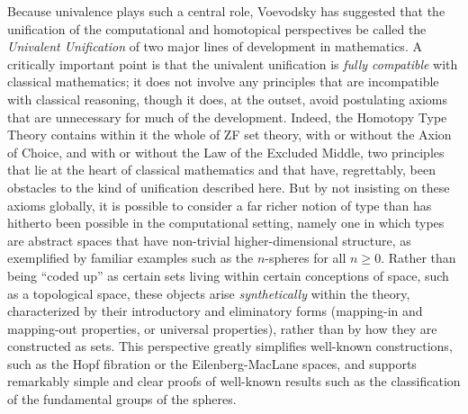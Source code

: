 \documentclass[11pt]{article}
\theoremstyle{remark}
\theoremstyle{definition}
\begin{document}
Because univalence plays such a central role, Voevodsky has suggested that the unification of the computational and
homotopical perspectives be called the \emph{Univalent Unification} of two major lines of development in mathematics.  A
critically important point is that the univalent unification is \emph{fully compatible} with classical mathematics; it
does not involve any principles that are incompatible with classical reasoning, though it does, at the outset, avoid
postulating axioms that are unnecessary for much of the development.  Indeed, the Homotopy Type Theory contains within
it the whole of ZF set theory, with or without the Axion of Choice, and with or without the Law of the Excluded Middle,
two principles that lie at the heart of classical mathematics and that have, regrettably, been obstacles to the kind of
unification described here.  But by not insisting on these axioms globally, it is possible to consider a far richer
notion of type than has hitherto been possible in the computational setting, namely one in which types are abstract
spaces that have non-trivial higher-dimensional structure, as exemplified by familiar examples such as the $n$-spheres
for all $n\geq 0$.  Rather than being ``coded up'' as certain sets living within certain conceptions of space, such as a
topological space, these objects arise \emph{synthetically} within the theory, characterized by their introductory and
eliminatory forms (mapping-in and mapping-out properties, or universal properties), rather than by how they are
constructed as sets.  This perspective greatly simplifies well-known constructions, such as the Hopf fibration or the
Eilenberg-MacLane spaces, and supports remarkably simple and clear proofs of well-known results such as the
classification of the fundamental groups of the spheres.
\end{document}
